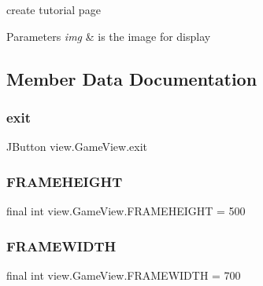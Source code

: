 create tutorial page 


\begin{DoxyParams}{Parameters}
{\em img} & is the image for display \\
\hline
\end{DoxyParams}


\subsection{Member Data Documentation}
\hypertarget{classview_1_1_game_view_a3bf74babf6e5deb5f2c80a8d7b56ad77}{}\label{classview_1_1_game_view_a3bf74babf6e5deb5f2c80a8d7b56ad77} 
\subsubsection{\texorpdfstring{exit}{exit}}
{\footnotesize\ttfamily J\+Button view.\+Game\+View.\+exit\hspace{0.3cm}{\ttfamily [private]}}

\hypertarget{classview_1_1_game_view_a4883525ad5307e9ac642854eb6db66d1}{}\label{classview_1_1_game_view_a4883525ad5307e9ac642854eb6db66d1} 
\subsubsection{\texorpdfstring{F\+R\+A\+M\+E\+H\+E\+I\+G\+HT}{FRAMEHEIGHT}}
{\footnotesize\ttfamily final int view.\+Game\+View.\+F\+R\+A\+M\+E\+H\+E\+I\+G\+HT = 500\hspace{0.3cm}{\ttfamily [private]}}

\hypertarget{classview_1_1_game_view_a2ab92f79dc374ff6708c7798697b623a}{}\label{classview_1_1_game_view_a2ab92f79dc374ff6708c7798697b623a} 
\subsubsection{\texorpdfstring{F\+R\+A\+M\+E\+W\+I\+D\+TH}{FRAMEWIDTH}}
{\footnotesize\ttfamily final int view.\+Game\+View.\+F\+R\+A\+M\+E\+W\+I\+D\+TH = 700\hspace{0.3cm}{\ttfamily [private]}}

